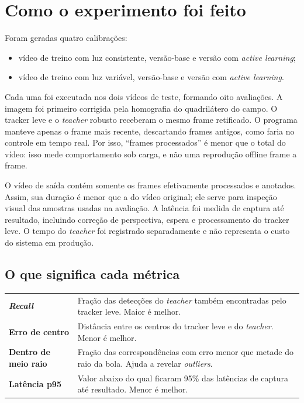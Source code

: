 \documentclass[10pt,a4paper]{article}
\begin{document}
\section{Como o experimento foi feito}

Foram geradas quatro calibrações:
\begin{itemize}
  \item vídeo de treino com luz consistente, versão-base e versão com \textit{active learning};
  \item vídeo de treino com luz variável, versão-base e versão com \textit{active learning}.
\end{itemize}

Cada uma foi executada nos dois vídeos de teste, formando oito avaliações. A imagem foi
primeiro corrigida pela homografia do quadrilátero do campo. O tracker leve e o
\textit{teacher} robusto receberam o mesmo frame retificado. O programa manteve apenas o
frame mais recente, descartando frames antigos, como faria no controle em tempo real.
Por isso, ``frames processados'' é menor que o total do vídeo: isso mede comportamento
sob carga, e não uma reprodução offline frame a frame.

O vídeo de saída contém somente os frames efetivamente processados e anotados. Assim, sua
duração é menor que a do vídeo original; ele serve para inspeção visual das amostras usadas
na avaliação. A latência foi medida de captura até resultado, incluindo correção de
perspectiva, espera e processamento do tracker leve. O tempo do \textit{teacher} foi
registrado separadamente e não representa o custo do sistema em produção.

\subsection*{O que significa cada métrica}
\begin{tabularx}{\linewidth}{>{\bfseries}p{3.4cm}X}
\toprule
\textit{Recall} & Fração das detecções do \textit{teacher} também encontradas pelo tracker leve. Maior é melhor.\\
Erro de centro & Distância entre os centros do tracker leve e do \textit{teacher}. Menor é melhor.\\
Dentro de meio raio & Fração das correspondências com erro menor que metade do raio da bola. Ajuda a revelar \textit{outliers}.\\
Latência p95 & Valor abaixo do qual ficaram 95\% das latências de captura até resultado. Menor é melhor.\\
\bottomrule
\end{tabularx}
\end{document}
